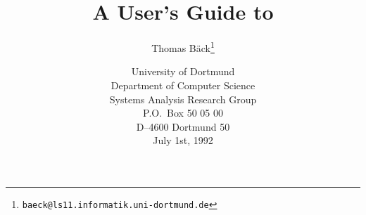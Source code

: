%
%

\parindent=0pt
\baselineskip

\let\ifUS=\iffalse
\let\ifUS=\iftrue

\ifUS
{}
\else
{}
\fi




\title{	A User's Guide to \GEN}
\author{Thomas B\"ack\thanks{\tt baeck@ls11.informatik.uni-dortmund.de}}

\date{	\normalsize
	University of Dortmund					\\
	Department of Computer Science				\\
	Systems Analysis Research Group				\\
	P.O.~Box 50 05 00					\\
	D--4600 Dortmund 50					\\
	July 1st, 1992}



\maketitle

\vfill
\vfill
\newpage
\tableofcontents
\newpage

\ifUS
\else
	\newpage
\fi
\ifUS
	\newpage
\else
\fi
\ifUS
	\newpage
\else
\fi
\newpage
\ifUS
	\newpage
\else
\fi
\ifUS
	\newpage
\else
\fi

\ifUS

\else

\fi



